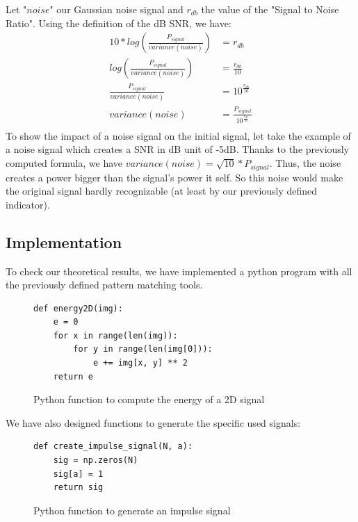 \documentclass[a4paper]{article}
\begin{document}
Let "$noise$" our Gaussian noise signal and $r_{db}$ the value of the "Signal to Noise Ratio".    Using the definition of the dB SNR, we have:
\begin{equation*}
\begin{aligned}
	10 * log(\frac{P_{signal}}{variance(noise) })	&= r_{db} \\
	log(\frac{P_{signal}}{variance(noise) })		&= \frac{r_{db}}{10} \\
	\frac{P_{signal}}{variance(noise) }				&= 10^{\frac{r_{db}}{10}} \\
	variance(noise)									&= \frac{P_{signal}}{10^{\frac{r_{db}}{10}} } \\
\end{aligned}
\end{equation*}
To show the impact of a noise signal on the initial signal, let take the example of a noise signal which creates a SNR in dB unit of -5dB.   Thanks to the previously computed formula, we have $variance(noise) = \sqrt{10} * P_{signal}$.   Thus, the noise creates a power bigger than the signal's power it self.   So this noise would make the original signal hardly recognizable (at least by our previously defined indicator).






    \subsection{Implementation}
    To check our theoretical results, we have implemented a python program with all the previously defined pattern matching tools.
\begin{figure}[ht!]
\begin{lstlisting}
def energy2D(img):
    e = 0
    for x in range(len(img)):
        for y in range(len(img[0])):
            e += img[x, y] ** 2
    return e
\end{lstlisting}
\caption{Python function to compute the energy of a 2D signal}
\label{energy2D.py}
\end{figure}



We have also designed functions to generate the specific used signals:

\begin{figure}[ht!]
\begin{lstlisting}
def create_impulse_signal(N, a):
    sig = np.zeros(N)
    sig[a] = 1
    return sig

\end{lstlisting}
\caption{Python function to generate an impulse signal}
\label{impulse.py}
\end{figure}
\end{document}

